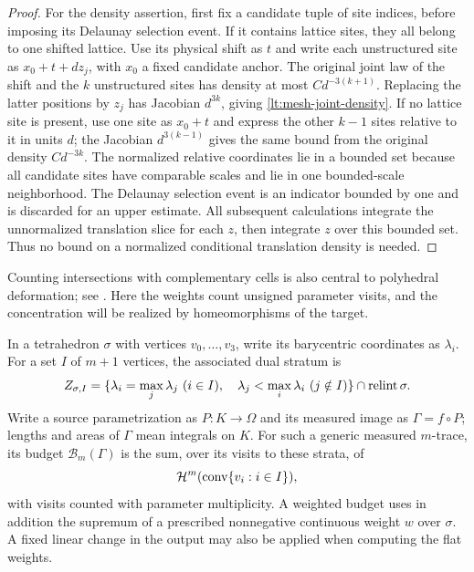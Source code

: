 \begin{proof}
For the density assertion, first fix a candidate tuple of site
indices, before imposing its Delaunay selection event.  If it contains
lattice sites, they all belong to one shifted lattice.  Use its
physical shift as $t$ and write each unstructured site as
$x_0+t+dz_j$, with $x_0$ a fixed candidate anchor.  The original
joint law of the shift and the $k$ unstructured sites has density
at most $Cd^{-3(k+1)}$.  Replacing the latter positions by $z_j$
has Jacobian $d^{3k}$, giving \eqref{lt:mesh-joint-density}.
If no lattice site is present, use one site as $x_0+t$ and express
the other $k-1$ sites relative to it in units $d$; the Jacobian
$d^{3(k-1)}$ gives the same bound from the original density
$Cd^{-3k}$.  The normalized relative coordinates lie in a bounded
set because all candidate sites have comparable scales and lie in
one bounded-scale neighborhood.  The Delaunay selection event is
an indicator bounded by one and is discarded for an upper estimate.
All subsequent calculations integrate the unnormalized translation
slice for each $z$, then integrate $z$ over this bounded set.  Thus
no bound on a normalized conditional translation density is needed.
\end{proof}

Counting intersections with complementary cells is also central to
polyhedral deformation; see \cite[Proposition~2.2]{White1999}. Here
the weights count unsigned parameter visits, and the concentration
will be realized by homeomorphisms of the target.

\begin{definition}
\label{lt:tie-budget}
In a tetrahedron $\sigma$ with vertices $v_0,\ldots,v_3$, write its
barycentric coordinates as $\lambda_i$.  For a set $I$ of $m+1$
vertices, the associated dual stratum is
\[
 Z_{\sigma,I}=
 \{\lambda_i=\max_j\lambda_j\ (i\in I),\quad
           \lambda_j<\max_i\lambda_i\ (j\notin I)\}
          \cap\operatorname{relint}\sigma.
\]
Write a source parametrization as $P:K\to\Omega$ and its measured
image as $\Gamma=f\circ P$; lengths and areas of $\Gamma$ mean
integrals on $K$.  For such a generic measured $m$-trace, its budget
$\mathcal B_m(\Gamma)$ is the sum, over its visits to these strata, of
\[
 \mathcal H^m(\operatorname{conv}\{v_i:i\in I\}),
\]
with visits counted with parameter multiplicity.  A weighted budget
uses in addition the supremum of a prescribed nonnegative continuous
weight $w$ over $\sigma$.  A fixed linear change in the output may
also be applied when computing the flat weights.
\end{definition}

